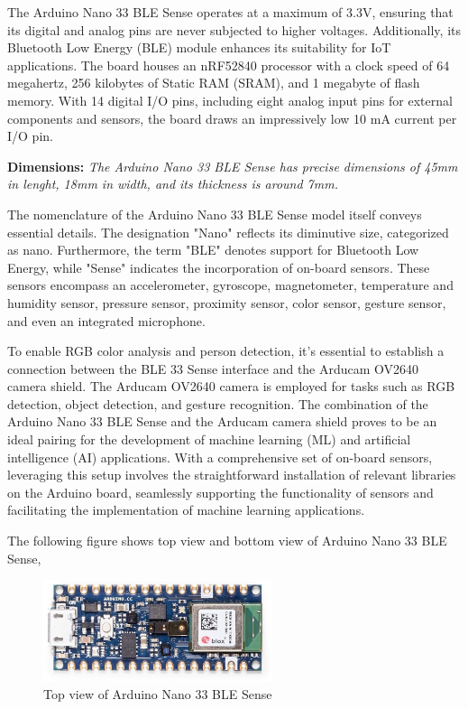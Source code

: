 The Arduino Nano 33 BLE Sense operates at a maximum of 3.3V, ensuring that its digital and analog pins are never subjected to higher voltages. Additionally, its Bluetooth Low Energy (BLE) module enhances its suitability for IoT applications. The board houses an nRF52840 processor with a clock speed of 64 megahertz, 256 kilobytes of Static RAM (SRAM), and 1 megabyte of flash memory. With 14 digital I/O pins, including eight analog input pins for external components and sensors, the board draws an impressively low 10 mA current per I/O pin.

\textbf{Dimensions:} \textit{The Arduino Nano 33 BLE Sense has precise dimensions of 45mm in lenght, 18mm in width, and its thickness is around 7mm.}

The nomenclature of the Arduino Nano 33 BLE Sense model itself conveys essential details. The designation "Nano" reflects its diminutive size, categorized as nano. Furthermore, the term "BLE" denotes support for Bluetooth Low Energy, while "Sense" indicates the incorporation of on-board sensors. These sensors encompass an accelerometer, gyroscope, magnetometer, temperature and humidity sensor, pressure sensor, proximity sensor, color sensor, gesture sensor, and even an integrated microphone.\cite{Raj:2019}

To enable RGB color analysis and person detection, it's essential to establish a connection between the BLE 33 Sense interface and the Arducam OV2640 camera shield. The Arducam OV2640 camera is employed for tasks such as RGB detection, object detection, and gesture recognition. The combination of the Arduino Nano 33 BLE Sense and the Arducam camera shield proves to be an ideal pairing for the development of machine learning (ML) and artificial intelligence (AI) applications. With a comprehensive set of on-board sensors, leveraging this setup involves the straightforward installation of relevant libraries on the Arduino board, seamlessly supporting the functionality of sensors and facilitating the implementation of machine learning applications.


The following figure shows top view and bottom view of Arduino Nano 33 BLE Sense, 

\begin{figure}[h!]
	\centering
	\includegraphics[width=0.6\textwidth]{Images/hardware/arduino-nano-33-ble-sense_1.jpg}
	\caption{Top view of Arduino Nano 33 BLE Sense} \label{fig:Arduino}
\end{figure}

